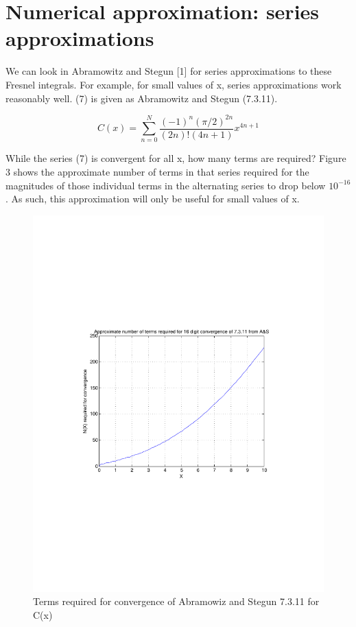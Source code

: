 \documentclass[a4paper,11pt]{article}
\begin{document}
\section{Numerical approximation: series approximations}

We can look in Abramowitz and Stegun [1] for series approximations to these Fresnel integrals. For example, for small values of x, series approximations work reasonably well. (7) is given as Abramowitz and Stegun (7.3.11). 

\begin{equation}
    C(x) = \sum_{n=0}^N \frac{(-1)^n (\pi/2)^{2n}}{(2n)! (4n+1)} x^{4n+1}
\end{equation}

While the series (7) is convergent for all x, how many terms are required? Figure 3 shows the approximate number of terms in that series required for the magnitudes of those individual terms in the alternating series to drop below $10^{-16}$. As such, this approximation will only be useful for small values of x.

\begin{figure}
\centering
    \includegraphics[width=5in]{Convergence7311.pdf}
        \caption{Terms required for convergence of Abramowiz and Stegun 7.3.11 for C(x)}
\end{figure}
\end{document}
